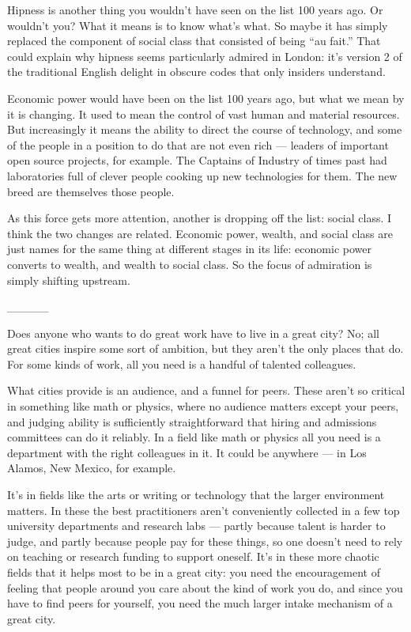 Hipness is another thing you wouldn't have seen on the list 100 years
ago. Or wouldn't you? What it means is to know what's what. So maybe it
has simply replaced the component of social class that consisted of
being ``au fait.'' That could explain why hipness seems particularly
admired in London: it's version 2 of the traditional English delight in
obscure codes that only insiders understand.

Economic power would have been on the list 100 years ago, but what we
mean by it is changing. It used to mean the control of vast human and
material resources. But increasingly it means the ability to direct the
course of technology, and some of the people in a position to do that
are not even rich --- leaders of important open source projects, for
example. The Captains of Industry of times past had laboratories full of
clever people cooking up new technologies for them. The new breed are
themselves those people.

As this force gets more attention, another is dropping off the list:
social class. I think the two changes are related. Economic power,
wealth, and social class are just names for the same thing at different
stages in its life: economic power converts to wealth, and wealth to
social class. So the focus of admiration is simply shifting upstream.

\_\_\_\_\_

Does anyone who wants to do great work have to live in a great city? No;
all great cities inspire some sort of ambition, but they aren't the only
places that do. For some kinds of work, all you need is a handful of
talented colleagues.

What cities provide is an audience, and a funnel for peers. These aren't
so critical in something like math or physics, where no audience matters
except your peers, and judging ability is sufficiently straightforward
that hiring and admissions committees can do it reliably. In a field
like math or physics all you need is a department with the right
colleagues in it. It could be anywhere --- in Los Alamos, New Mexico,
for example.

It's in fields like the arts or writing or technology that the larger
environment matters. In these the best practitioners aren't conveniently
collected in a few top university departments and research labs ---
partly because talent is harder to judge, and partly because people pay
for these things, so one doesn't need to rely on teaching or research
funding to support oneself. It's in these more chaotic fields that it
helps most to be in a great city: you need the encouragement of feeling
that people around you care about the kind of work you do, and since you
have to find peers for yourself, you need the much larger intake
mechanism of a great city.

